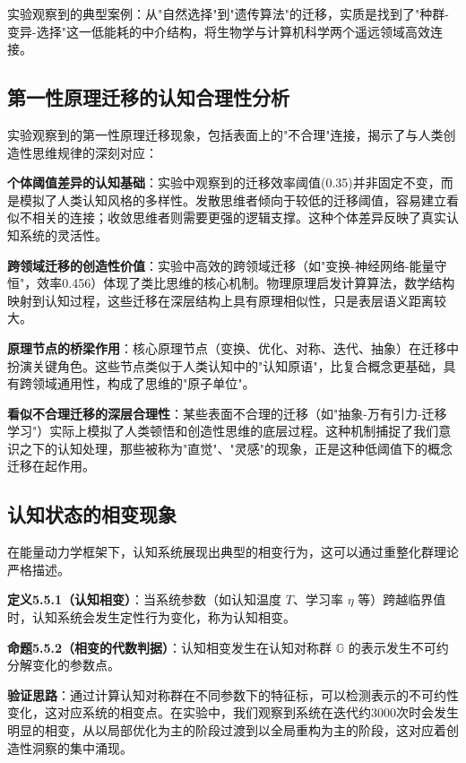 \documentclass[12pt,a4paper]{article}
\newcommand{\cognitivegroup}{\mathbb{G}}
\begin{document}
实验观察到的典型案例：从"自然选择"到"遗传算法"的迁移，实质是找到了"种群-变异-选择"这一低能耗的中介结构，将生物学与计算机科学两个遥远领域高效连接。

\subsection{第一性原理迁移的认知合理性分析}

实验观察到的第一性原理迁移现象，包括表面上的"不合理"连接，揭示了与人类创造性思维规律的深刻对应：

\textbf{个体阈值差异的认知基础}：实验中观察到的迁移效率阈值(0.35)并非固定不变，而是模拟了人类认知风格的多样性。发散思维者倾向于较低的迁移阈值，容易建立看似不相关的连接；收敛思维者则需要更强的逻辑支撑。这种个体差异反映了真实认知系统的灵活性。

\textbf{跨领域迁移的创造性价值}：实验中高效的跨领域迁移（如"变换-神经网络-能量守恒"，效率0.456）体现了类比思维的核心机制。物理原理启发计算算法，数学结构映射到认知过程，这些迁移在深层结构上具有原理相似性，只是表层语义距离较大。

\textbf{原理节点的桥梁作用}：核心原理节点（变换、优化、对称、迭代、抽象）在迁移中扮演关键角色。这些节点类似于人类认知中的"认知原语"，比复合概念更基础，具有跨领域通用性，构成了思维的"原子单位"。

\textbf{看似不合理迁移的深层合理性}：某些表面不合理的迁移（如"抽象-万有引力-迁移学习"）实际上模拟了人类顿悟和创造性思维的底层过程。这种机制捕捉了我们意识之下的认知处理，那些被称为"直觉"、"灵感"的现象，正是这种低阈值下的概念迁移在起作用。

\subsection{认知状态的相变现象}

在能量动力学框架下，认知系统展现出典型的相变行为，这可以通过重整化群理论严格描述。

\textbf{定义5.5.1（认知相变）}：当系统参数（如认知温度 $T$、学习率 $\eta$ 等）跨越临界值时，认知系统会发生定性行为变化，称为认知相变。

\textbf{命题5.5.2（相变的代数判据）}：认知相变发生在认知对称群 $\cognitivegroup$ 的表示发生不可约分解变化的参数点。

\textbf{验证思路}：通过计算认知对称群在不同参数下的特征标，可以检测表示的不可约性变化，这对应系统的相变点。在实验中，我们观察到系统在迭代约3000次时会发生明显的相变，从以局部优化为主的阶段过渡到以全局重构为主的阶段，这对应着创造性洞察的集中涌现。
\end{document}
